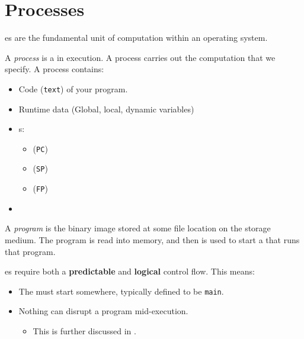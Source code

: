 \section{Processes}\label{sec:Processes}
es are the fundamental unit of computation within an operating system.
\begin{definition}[Process]\label{def:Process}
  A \emph{process} is a  in execution.
  A process carries out the computation that we specify.
  A process contains:
  \begin{itemize}[noitemsep]
  \item Code (\texttt{text}) of your program.
  \item Runtime data (Global, local, dynamic variables)
  \item {}s:
    \begin{itemize}[noitemsep]
    \item {} (\texttt{PC})
    \item {} (\texttt{SP})
    \item {} (\texttt{FP})
    \end{itemize}
  \item {}
  \end{itemize}
\end{definition}

\begin{definition}[Program]\label{def:Program}
  A \emph{program} is the binary image stored at some file location on the storage medium.
  The program is read into memory, and then is used to start a  that runs that program.
\end{definition}

es require both a \textbf{predictable} and \textbf{logical} control flow.
This means:
\begin{itemize}[noitemsep]
\item The  must start somewhere, typically defined to be \texttt{main}.
\item Nothing can disrupt a program mid-execution.
  \begin{itemize}[noitemsep]
  \item This is further discussed in .
  \end{itemize}
\end{itemize}

